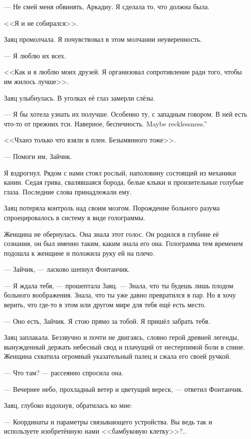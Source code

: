 --- Не смей меня обвинять, Аркадиу.
Я сделала то, что должна была.

<<Я и не собирался>>.

Заяц промолчала.
Я почувствовал в этом молчании неуверенность.

--- Я люблю их всех.

<<Как и я люблю моих друзей.
Я организовал сопротивление ради того, чтобы им жилось лучше>>.

Заяц улыбнулась.
В уголках её глаз замерли слёзы.

--- Я бы хотела узнать их получше.
Особенно ту, с западным говором.
В ней есть что-то от прежних тси.
{Наверное, беспечность.}
{Maybe recklessness.''}

<<Чханэ только что взяли в плен.
Безымянного тоже>>.

--- Помоги им, Зайчик.

Я вздрогнул.
Рядом с нами стоял рослый, наполовину состоящий из механики канин.
Седая грива, свалявшаяся борода, белые клыки и пронзительные голубые глаза.
Последние слова принадлежали ему.

Заяц потеряла контроль над своим мозгом.
Порождение больного разума спроецировалось в систему в виде голограммы.

Женщина не обернулась.
Она знала этот голос.
Он родился в глубине её сознания, он был именно таким, каким знала его она.
Голограмма тем временем подошла к женщине и положила руку ей на плечо.

--- Зайчик, --- ласково шепнул Фонтанчик.

--- Я ждала тебя, --- прошептала Заяц.
--- Знала, что ты будешь лишь плодом больного воображения.
Знала, что ты уже давно превратился в пар.
Но я хочу верить, что где-то в этом или другом мире для тебя ещё есть место.

--- Оно есть, Зайчик.
Я стою прямо за тобой.
Я пришёл забрать тебя.

Заяц заплакала.
Беззвучно и почти не двигаясь, словно герой древней легенды, вынужденный держать небесный свод и плачущий от нестерпимой боли в спине.
Женщина схватила огромный указательный палец и сжала его своей ручкой.

--- Что там? --- рассеянно спросила она.

--- Вечернее небо, прохладный ветер и цветущий вереск, --- ответил Фонтанчик.

Заяц, глубоко вздохнув, обратилась ко мне:

--- Координаты и параметры связывающего устройства.
Вы ведь так и используете изобретённую нами <<бамбуковую клетку>>?..

